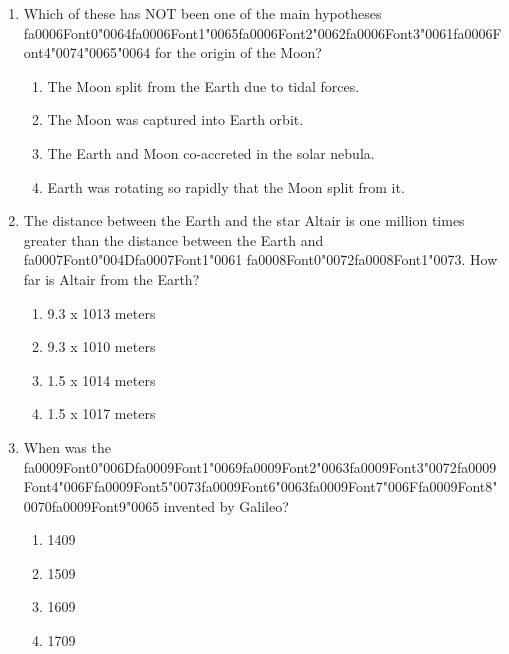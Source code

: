 \documentclass[12pt]{article}
\begin{document}
\begin{enumerate}[label=\arabic*.]
\begin{enumerate}[label=(\alph*)]
\end{enumerate}
\item Which of these has NOT been one of the main hypotheses {\csname fa0006Font0\endcsname\char"0064}{\csname fa0006Font1\endcsname\char"0065}{\csname fa0006Font2\endcsname\char"0062}{\csname fa0006Font3\endcsname\char"0061}{\csname fa0006Font4\endcsname\char"0074}{\char"0065}{\char"0064} for the origin of the
Moon?
\begin{enumerate}[label=(\alph*)]
    \item The Moon split from the Earth due to tidal forces.
    \item The Moon was captured into Earth orbit.
    \item The Earth and Moon co-accreted in the solar nebula.
    \item Earth was rotating so rapidly that the Moon split from it.
\end{enumerate}
\item The distance between the Earth and the star Altair is one million times greater than the
distance between the Earth and {\csname fa0007Font0\endcsname\char"004D}{\csname fa0007Font1\endcsname\char"0061} {\csname fa0008Font0\endcsname\char"0072}{\csname fa0008Font1\endcsname\char"0073}. How far is Altair from the Earth?
\begin{enumerate}[label=(\alph*)]
    \item 9.3 x 1013 meters
    \item 9.3 x 1010 meters
    \item 1.5 x 1014 meters
    \item 1.5 x 1017 meters
\end{enumerate}
\item When was the {\csname fa0009Font0\endcsname\char"006D}{\csname fa0009Font1\endcsname\char"0069}{\csname fa0009Font2\endcsname\char"0063}{\csname fa0009Font3\endcsname\char"0072}{\csname fa0009Font4\endcsname\char"006F}{\csname fa0009Font5\endcsname\char"0073}{\csname fa0009Font6\endcsname\char"0063}{\csname fa0009Font7\endcsname\char"006F}{\csname fa0009Font8\endcsname\char"0070}{\csname fa0009Font9\endcsname\char"0065} invented by Galileo?
\begin{enumerate}[label=(\alph*)]
    \item 1409
    \item 1509
    \item 1609
    \item 1709
\end{enumerate}
\end{enumerate}
\end{document}
